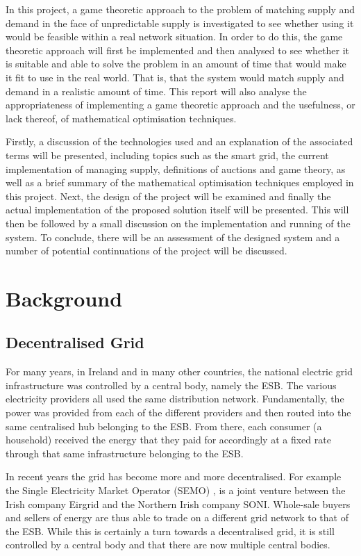 \documentclass[a4paper, notitlepage]{report}
\begin{document}
In this project, a game theoretic approach to the problem of matching supply and
demand in the face of unpredictable supply is investigated to see whether using
it would be feasible within a real network situation. In order to do this, the
game theoretic approach will first be implemented and then analysed to see
whether it is suitable and able to solve the problem in an amount of time that
would make it fit to use in the real world. That is, that the system would match
supply and demand in a realistic amount of time. This report will also analyse
the appropriateness of implementing a game theoretic approach and the
usefulness, or lack thereof, of mathematical optimisation techniques.

Firstly, a discussion of the technologies used and an explanation of the
associated terms will be presented, including topics such as the smart grid, the
current implementation of managing supply, definitions of auctions and game
theory, as well as a brief summary of the mathematical optimisation techniques
employed in this project. Next, the design of the project will be examined and
finally the actual implementation of the proposed solution itself will be
presented. This will then be followed by a small discussion on the
implementation and running of the system. To conclude, there will be an
assessment of the designed system and a number of potential continuations of the
project will be discussed.
\part{Background}
\label{sec:org133af63}
\chapter{Decentralised Grid}
\label{sec:orga16982c}
For many years, in Ireland and in many other countries, the national electric grid
infrastructure was controlled by a central body, namely the ESB. The various
electricity providers all used the same distribution network. Fundamentally, the
power was provided from each of the different providers and then routed into the
same centralised hub belonging to the ESB. From there, each consumer (a
household) received the energy that they paid for accordingly at a fixed rate
through that same infrastructure belonging to the ESB.

In recent years the grid has become more and more decentralised. For example the
Single Electricity Market Operator (SEMO) \cite{semo}, is a joint venture between
the Irish company Eirgrid and the Northern Irish company SONI. Whole-sale buyers
and sellers of energy are thus able to trade on a different grid network to that
of the ESB. While this is certainly a turn towards a decentralised grid, it is
still controlled by a central body and that there are now multiple central
bodies.
\end{document}
